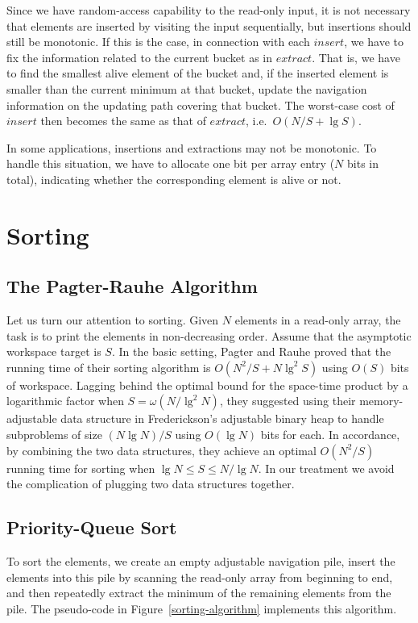 \documentclass[final,onetabnum,onefignum,onethmnum]{siamltex}
\newcommand{\Insert}{\mbox{$\mathit{insert}$}}
\newcommand{\Extract}{\mbox{$\mathit{extract}$}}
\begin{document}
Since we have random-access capability to the read-only input, it is
not necessary that elements are inserted by visiting the input
sequentially, but insertions should still be monotonic. If
this is the case, in connection with each \Insert{}, we have to fix
the information related to the current bucket as in \Extract{}. That
is, we have to find the smallest alive element of the bucket and, if
the inserted element is smaller than the current minimum at that
bucket, update the navigation information on the updating path covering
that bucket. The worst-case cost of \Insert{} then becomes
the same as that of \Extract{}, i.e.~$O(N/S + \lg S)$.

In some applications, insertions and extractions may 
not be monotonic. To handle this situation, we have to allocate one bit per array entry
($N$ bits in total), indicating whether the corresponding element is alive or not.  

\section{Sorting}
\label{sec:sorting}

\subsection{The Pagter-Rauhe Algorithm}
Let us turn our attention to sorting. Given $N$ elements in
a read-only array, the task is to print the elements in
non-decreasing order. Assume that the asymptotic workspace target is $S$.
In the basic setting, Pagter and Rauhe \cite{PR98} proved that
the running time of their sorting algorithm is $O(N^2/S + N \lg^2 S)$
using $O(S)$ bits of workspace. Lagging behind the optimal bound for
the space-time product by a logarithmic factor when $S=\omega(N/\lg^2
N)$, they suggested using their memory-adjustable data structure in
Frederickson's adjustable binary heap \cite{Fre87} to handle
subproblems of size $(N\lg N)/S$ using $O(\lg N)$ bits for each.  In
accordance, by combining the two data structures, they
achieve an optimal $O(N^2/S)$ running time for sorting
when $\lg N \leq S \leq N/\lg N$.  In our treatment we avoid the
complication of plugging two data structures together.

\subsection{Priority-Queue Sort} 
To sort the elements, we create an empty adjustable navigation
pile, insert the elements into this pile by scanning the read-only
array from beginning to end, and then repeatedly extract the minimum of the
remaining elements from the pile. The pseudo-code in
Figure~\ref{sorting-algorithm} implements this algorithm.
\end{document}
